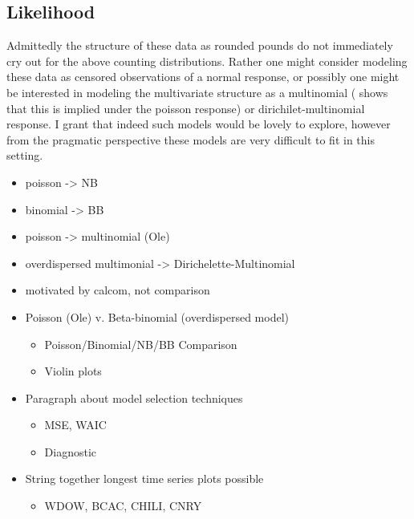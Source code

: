 \documentclass[12pt]{article}
\begin{document}
%
%
\subsection{Likelihood}\label{likeDiscussion}
%
%

Admittedly the structure of these data as rounded pounds do not immediately cry 
out for the above counting distributions. Rather one might consider modeling 
these data as censored observations of a normal response, or possibly one might 
be interested in modeling the multivariate structure as a multinomial 
( shows that this is implied under the 
poisson response) or dirichilet-multinomial response. I grant that indeed such 
models would be lovely to explore, however from the pragmatic perspective these 
models are very difficult to fit in this setting. 

\begin{itemize}
	\item poisson -> NB
	\item binomial -> BB
	\item poisson -> multinomial (Ole)
	\item overdispersed multimonial -> Dirichelette-Multinomial
\end{itemize}




%
\begin{itemize}
\item motivated by calcom, not comparison
\item Poisson (Ole) v. Beta-binomial (overdispersed model)
	\begin{itemize}
	\item Poisson/Binomial/NB/BB Comparison
	\item Violin plots
	\end{itemize}
\item Paragraph about model selection techniques
	\begin{itemize}
	\item MSE, WAIC
	\item Diagnostic
	\end{itemize}
\item String together longest time series plots possible
	\begin{itemize}
	\item WDOW, BCAC, CHILI, CNRY
	\end{itemize}
\end{itemize}

%
%
\end{document}

